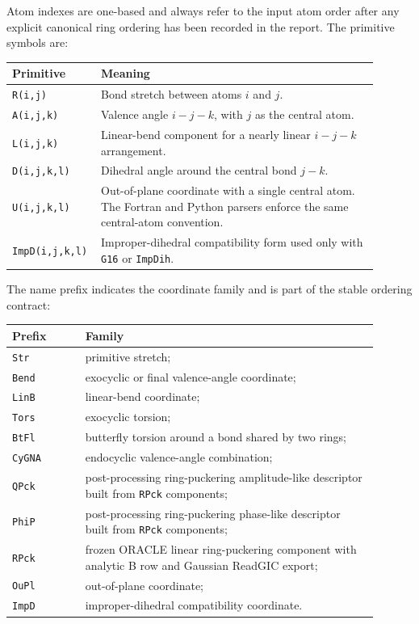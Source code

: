 \documentclass[11pt]{article}
\begin{document}
\noindent
Atom indexes are one-based and always refer to the input atom order after any
explicit canonical ring ordering has been recorded in the report.  The
primitive symbols are:

\begin{longtable}{@{}p{0.17\linewidth}p{0.73\linewidth}@{}}
\toprule
Primitive & Meaning \\
\midrule
\endhead
\texttt{R(i,j)} & Bond stretch between atoms \(i\) and \(j\). \\
\texttt{A(i,j,k)} & Valence angle \(i-j-k\), with \(j\) as the central atom. \\
\texttt{L(i,j,k)} & Linear-bend component for a nearly linear \(i-j-k\)
arrangement. \\
\texttt{D(i,j,k,l)} & Dihedral angle around the central bond \(j-k\). \\
\texttt{U(i,j,k,l)} & Out-of-plane coordinate with a single central atom.  The
Fortran and Python parsers enforce the same central-atom convention. \\
\texttt{ImpD(i,j,k,l)} & Improper-dihedral compatibility form used only with
\texttt{G16} or \texttt{ImpDih}. \\
\bottomrule
\end{longtable}

\noindent
The name prefix indicates the coordinate family and is part of the stable
ordering contract:

\begin{longtable}{@{}p{0.18\linewidth}p{0.72\linewidth}@{}}
\toprule
Prefix & Family \\
\midrule
\endhead
\texttt{Str} & primitive stretch; \\
\texttt{Bend} & exocyclic or final valence-angle coordinate; \\
\texttt{LinB} & linear-bend coordinate; \\
\texttt{Tors} & exocyclic torsion; \\
\texttt{BtFl} & butterfly torsion around a bond shared by two rings; \\
\texttt{CyGNA} & endocyclic valence-angle combination; \\
\texttt{QPck} & post-processing ring-puckering amplitude-like descriptor built
from \texttt{RPck} components; \\
\texttt{PhiP} & post-processing ring-puckering phase-like descriptor built from
\texttt{RPck} components; \\
\texttt{RPck} & frozen ORACLE linear ring-puckering component with analytic B
row and Gaussian ReadGIC export; \\
\texttt{OuPl} & out-of-plane coordinate; \\
\texttt{ImpD} & improper-dihedral compatibility coordinate. \\
\bottomrule
\end{longtable}
\end{document}
